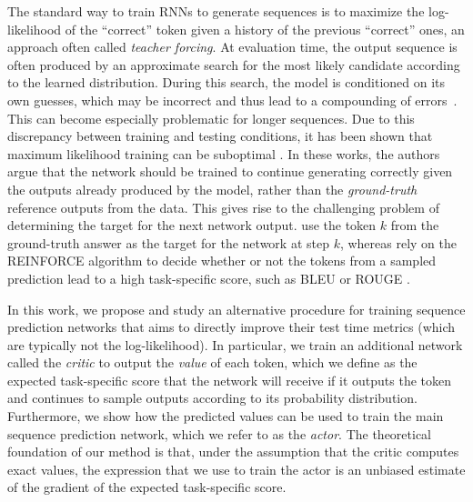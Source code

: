\documentclass{article} \usepackage{iclr2017_conference,times}
\begin{document}
The standard way to train RNNs to generate sequences is to
maximize the log-likelihood of the ``correct'' token given a history of the
previous ``correct'' ones, an approach often called \textit{teacher forcing}.
At evaluation time, the output sequence is often produced by an approximate search for 
the most likely candidate according to the learned distribution. During this search,
the model is conditioned on its own guesses, which may be incorrect and thus lead to a compounding of errors~\citep{bengio2015scheduled}.
This can become especially problematic for longer sequences.
Due to this discrepancy between training and testing conditions, it has been shown that maximum likelihood training can be suboptimal \citep{bengio2015scheduled,ranzato2015sequence}. 
In these works, the authors argue that the network should be trained to continue
generating correctly given the outputs already produced by the model, rather
than the \emph{ground-truth} reference outputs from the data. This gives rise to the challenging problem of
determining the target for the next network output.
\citet{bengio2015scheduled} use the
token $k$ from the ground-truth answer as the target for the network at step
$k$, whereas \citet{ranzato2015sequence} rely on the REINFORCE
algorithm \citep{williams1992simple} to decide whether or not the tokens from a
sampled prediction lead to a high task-specific score, such as BLEU 
\citep{papineni2002bleu} or ROUGE \citep{lin2003automatic}.

In this work, we propose and study an alternative procedure for training
sequence prediction networks that aims to directly improve their test time
metrics (which are typically not the log-likelihood).
In particular, we train an additional network called 
the \textit{critic} to output the \textit{value} of each
token, which we define as the expected task-specific score that the network
will receive if it outputs the token and continues to sample outputs according to
its probability distribution. Furthermore, we show how the predicted values can be used
to train the main sequence prediction network, which we refer to as the \textit{actor}.
The theoretical foundation of our method is that, under the assumption that the
critic computes exact values, the expression that we use to train the actor is an unbiased
estimate of the gradient of the expected task-specific score. 
\end{document}
